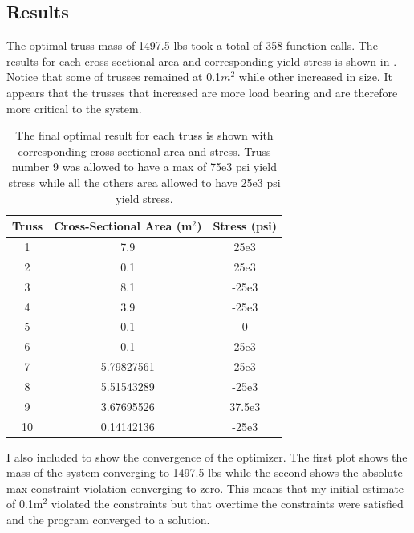 \documentclass{article}
\begin{document}
\subsection{Results}

The optimal truss mass of 1497.5 lbs took a total of 358 function calls. The results for each cross-sectional area and corresponding yield stress is shown in . Notice that some of trusses remained at 0.1$m^2$ while other increased in size. It appears that the trusses that increased are more load bearing and are therefore more critical to the system.

\begin{table}[htb]
	\centering
	\caption{The final optimal result for each truss is shown with corresponding cross-sectional area and stress. Truss number 9 was allowed to have a max of 75e3 psi yield stress while all the others area allowed to have 25e3 psi yield stress.}
	\label{tab:area_stress}
	\begin{tabular}{c|c|c}
		\toprule
		Truss & Cross-Sectional Area (m$^2$)& Stress (psi) \\
		\midrule
		1 & 7.9 & 25e3 \\
		2 & 0.1 & 25e3 \\
		3 & 8.1 & -25e3 \\
		4 & 3.9 & -25e3 \\
		5 & 0.1 & 0 \\
		6 & 0.1 & 25e3 \\
		7 & 5.79827561 & 25e3 \\
		8 & 5.51543289 & -25e3\\
		9 & 3.67695526 & 37.5e3 \\
		10 & 0.14142136 & -25e3 \\
		\bottomrule
	\end{tabular}
\end{table}

I also included  to show the convergence of the optimizer. The first plot shows the mass of the system converging to 1497.5 lbs while the second shows the absolute max constraint violation converging to zero. This means that my initial estimate of 0.1m$^2$ violated the constraints but that overtime the constraints were satisfied and the program converged to a solution. 
\end{document}
